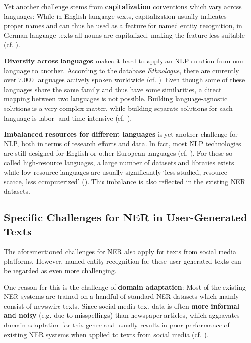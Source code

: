 Yet another challenge stems from \textbf{capitalization} conventions which vary across languages: While in English-language texts, capitalization usually indicates proper names and can thus be used as a feature for named entity recognition, in German-language texts all nouns are capitalized, making the feature less suitable (cf. \cite{benikova-etal-2014-nosta}).

\textbf{Diversity across languages} makes it hard to apply an NLP solution from one language to another. According to the database \textit{Ethnologue}, there are currently over 7.000 languages actively spoken worldwide (cf. \cite{ethnologue_how_2022}). Even though some of these languages share the same family and thus have some similarities, a direct mapping between two languages is not possible. Building language-agnostic solutions is a very complex matter, while building separate solutions for each language is labor- and time-intensive (cf. \cite[14]{vajjala_practical_2020}).

\textbf{Imbalanced resources for different languages} is yet another challenge for NLP, both in terms of research efforts and data. In fact, most NLP technologies are still designed for English or other European languages (cf. \cite{singh_natural_2008}). For these so-called high-resource languages, a large number of datasets and libraries exists while low-resource languages are usually significantly `less studied, resource scarce, less computerized' (\cite{magueresse_low-resource_2020}). This imbalance is also reflected in the existing NER datasets. 

\subsection{Specific Challenges for NER in User-Generated Texts}

The aforementioned challenges for NER also apply for texts from social media platforms. However, named entity recognition for these user-generated texts can be regarded as even more challenging. 

One reason for this is the challenge of \textbf{domain adaptation}: Most of the existing NER systems are trained on a handful of standard NER datasets which mainly consist of newswire texts. 
Since social media text data is often \textbf{more informal and noisy} (e.g. due to misspellings) than newspaper articles, which aggravates domain adaptation for this genre and usually results in poor performance of existing NER systems when applied to texts from social media (cf.  \cite{ritter_2011}). 

